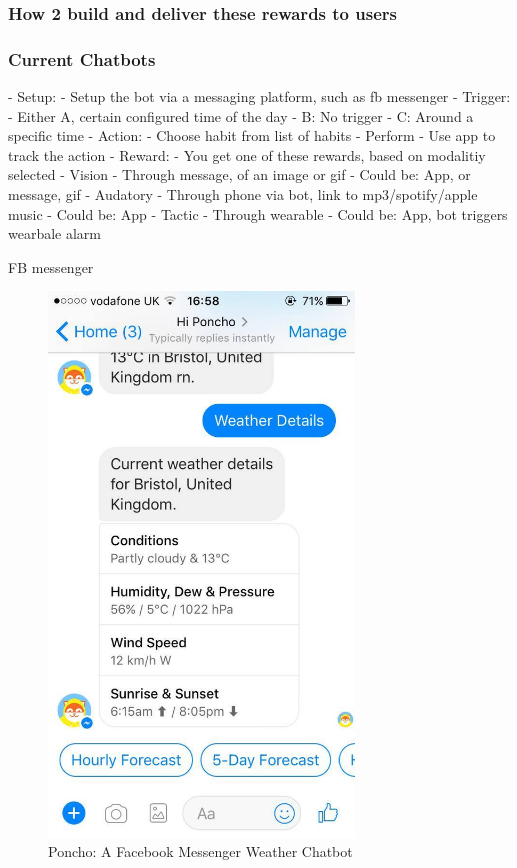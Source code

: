 \subsubsection*{How 2 build and deliver these rewards to users}

\subsubsection*{Current Chatbots}

  - Setup:
    - Setup the bot via a messaging platform, such as fb messenger
  - Trigger:
      - Either A, certain configured time of the day
      -        B: No trigger
      -        C: Around a specific time
  - Action:
    - Choose habit from list of habits
    - Perform
    - Use app to track the action
  - Reward:
    - You get one of these rewards, based on modalitiy selected
    - Vision
      - Through message, of an image or gif
      - Could be: App, or message, gif
    - Audatory
      - Through phone via bot, link to mp3/spotify/apple music
      - Could be: App
    - Tactic
      - Through wearable
      - Could be: App, bot triggers wearbale alarm

FB messenger

\begin{figure}[ht] %
    \centering
    \includegraphics[width=3.2in]{../resources/poncho.jpg}
    \caption{Poncho: A Facebook Messenger Weather Chatbot}
    \label{fig:poncho}
\end{figure}

